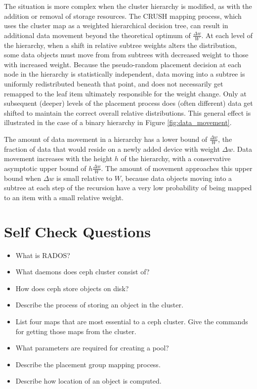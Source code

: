 \documentclass[12pt,a4paper]{report}
\begin{document}
The situation is more complex when the cluster hierarchy is modified, as with
the addition or removal of storage resources. The CRUSH mapping process, which
uses the cluster map as a weighted hierarchical decision tree, can result in
additional data movement beyond the theoretical optimum of $\frac{\Delta
w}{W}$. At each level of the hierarchy, when a shift in relative subtree
weights alters the distribution, some data objects must move from from subtrees
with decreased weight to those with increased weight. Because the pseudo-random
placement decision at each node in the hierarchy is statistically independent,
data moving into a subtree is uniformly redistributed beneath that point, and
does not necessarily get remapped to the leaf item ultimately responsible for
the weight change. Only at subsequent (deeper) levels of the placement process
does (often different) data get shifted to maintain the correct overall
relative distributions. This general effect is illustrated in the case of a
binary hierarchy in Figure \ref{fig:data_movement}.

The amount of data movement in a hierarchy has a lower bound  of $\frac{\Delta
w}{W}$, the fraction of data that would reside on a newly added device with
weight $\Delta w$. Data movement increases with the height $h$ of the
hierarchy, with a conservative asymptotic upper bound of $h \frac{\Delta
w}{W}$. The amount of movement approaches this upper bound when $\Delta w$ is
small relative to $W$, because data objects moving into a subtree at each step
of the recursion have a very low probability of being mapped to an item with a
small relative weight.

\section{Self Check Questions}

\begin{itemize}
	\item What is RADOS?

	\item What daemons does ceph cluster consist of?

	\item How does ceph store objects on disk?

	\item Describe the process of storing an object in the cluster.

	\item List four maps that are most essential to a ceph cluster. Give
		the commands for getting those maps from the cluster.

	\item What parameters are required for creating a pool?

	\item Describe the placement group mapping process.

	\item Describe how location of an object is computed.
\end{itemize}
\end{document}
